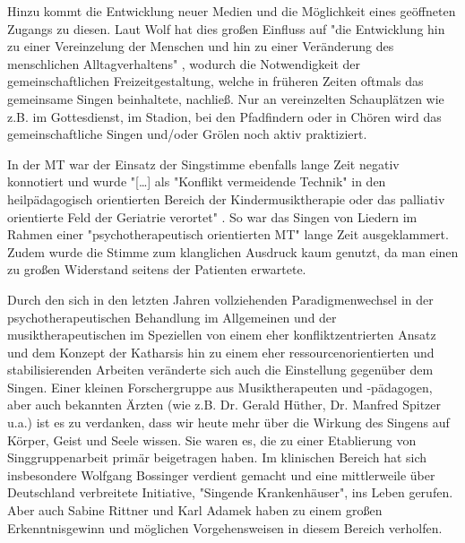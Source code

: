 Hinzu kommt die Entwicklung neuer Medien und die Möglichkeit eines geöffneten Zugangs zu diesen. Laut Wolf hat dies großen Einfluss auf "die Entwicklung hin zu einer Vereinzelung der Menschen und hin zu einer Veränderung des menschlichen Alltagverhaltens" \autocite[10]{wolf2012}, wodurch die Notwendigkeit der gemeinschaftlichen Freizeitgestaltung, welche in früheren Zeiten oftmals das gemeinsame Singen beinhaltete, nachließ. Nur an vereinzelten Schauplätzen wie z.B. im Gottesdienst, im Stadion, bei den Pfadfindern oder in Chören wird das gemeinschaftliche Singen und/oder Grölen noch aktiv praktiziert.

In der MT war der Einsatz der Singstimme ebenfalls lange Zeit negativ konnotiert und wurde "[\ldots] als "Konflikt vermeidende Technik" in den heilpädagogisch orientierten Bereich der Kindermusiktherapie oder das palliativ orientierte Feld der Geriatrie verortet" \autocite[10]{wolf2012}. So war das Singen von Liedern im Rahmen einer "psychotherapeutisch orientierten MT" lange Zeit ausgeklammert. Zudem wurde die Stimme zum klanglichen Ausdruck kaum genutzt, da man einen zu großen Widerstand seitens der Patienten erwartete. 


Durch den sich in den letzten Jahren vollziehenden Paradigmenwechsel in der psychotherapeutischen Behandlung im Allgemeinen und der musiktherapeutischen im Speziellen von einem eher konfliktzentrierten Ansatz und dem Konzept der Katharsis hin zu einem eher ressourcenorientierten und stabilisierenden Arbeiten veränderte sich auch die Einstellung gegenüber dem Singen. Einer kleinen Forschergruppe aus Musiktherapeuten und -pädagogen, aber auch bekannten Ärzten (wie z.B. Dr. Gerald Hüther, Dr. Manfred Spitzer u.a.) ist es zu verdanken, dass wir heute mehr über die Wirkung des Singens auf Körper, Geist und Seele wissen. Sie waren es, die zu einer Etablierung von Singgruppenarbeit primär beigetragen haben. Im klinischen Bereich hat sich insbesondere Wolfgang Bossinger verdient gemacht und eine mittlerweile über Deutschland verbreitete Initiative, "Singende Krankenhäuser", ins Leben gerufen. Aber auch Sabine Rittner und Karl Adamek haben zu einem großen Erkenntnisgewinn und möglichen Vorgehensweisen in diesem Bereich verholfen.


